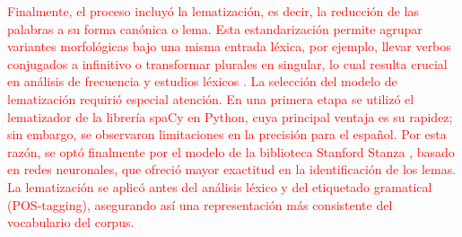\documentclass[11pt,a4paper]{article}
\begin{document}
		\textcolor{red}{
		Finalmente, el proceso incluyó la lematización, es decir, la reducción de las palabras a su forma canónica o lema. Esta estandarización permite agrupar variantes morfológicas bajo una misma entrada léxica, por ejemplo, llevar verbos conjugados a infinitivo o transformar plurales en singular, lo cual resulta crucial en análisis de frecuencia y estudios léxicos \cite{Orellana2018}. La selección del modelo de lematización requirió especial atención. En una primera etapa se utilizó el lematizador de la librería spaCy en Python, cuya principal ventaja es su rapidez; sin embargo, se observaron limitaciones en la precisión para el español. Por esta razón, se optó finalmente por el modelo de la biblioteca Stanford Stanza \cite{qi2020stanza}, basado en redes neuronales, que ofreció mayor exactitud en la identificación de los lemas. La lematización se aplicó antes del análisis léxico y del etiquetado gramatical (POS-tagging), asegurando así una representación más consistente del vocabulario del corpus.
		}
%		
%	
%	
\end{document}
